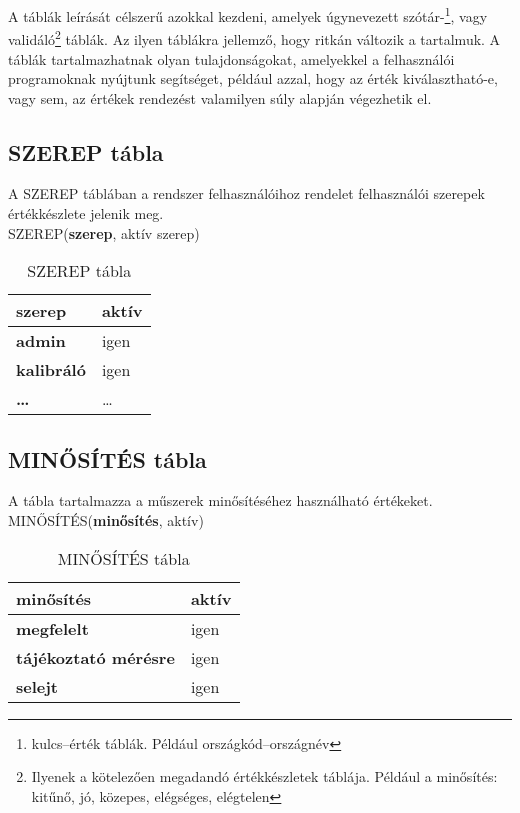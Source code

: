 \documentclass[a4paper,12pt]{report}
\newcommand{\pk}[1]{\textbf{#1}} %
\newcommand{\tabla}[1]{\noindent\MakeUppercase{#1}} %
\begin{document}
A táblák leírását célszerű azokkal kezdeni, amelyek úgynevezett 
szótár-\footnote{kulcs--érték táblák. Például országkód--országnév}, vagy
validáló\footnote{Ilyenek a kötelezően megadandó értékkészletek táblája. 
Például a minősítés: kitűnő, jó, közepes, elégséges, elégtelen} táblák.
Az ilyen táblákra jellemző, hogy ritkán változik a tartalmuk. A táblák 
tartalmazhatnak olyan tulajdonságokat, amelyekkel a felhasználói
programoknak nyújtunk segítséget, például azzal, hogy az érték
kiválasztható-e, vagy sem, az értékek rendezést valamilyen súly alapján 
végezhetik el.

\subsection{SZEREP tábla}
A \tabla{szerep} táblában a rendszer felhasználóihoz rendelet felhasználói 
szerepek értékkészlete jelenik meg.\\

\tabla{SZEREP}(\pk{szerep}, aktív szerep)

\begin{table}[ht!]
\centering
{\footnotesize \begin{tabular}[t]{|l|l|}
\hline
 \textbf{szerep}&aktív\\\hline
 \textbf{admin}&igen\\
 \textbf{kalibráló}&igen\\
 \textbf{\dots}&\dots\\
\end{tabular}}
\caption{SZEREP tábla} \label{tabSZEREP}
\end{table}


\subsection{MINŐSÍTÉS tábla}
A tábla tartalmazza a műszerek minősítéséhez használható értékeket.\\

\tabla{MINŐSÍTÉS}(\pk{minősítés}, aktív)
\begin{table}[ht!]
\centering
\begin{footnotesize}
\begin{tabular}[t]{|l|l|}
\hline
 \textbf{minősítés}&aktív\\\hline
 \textbf{megfelelt}&igen\\
 \textbf{tájékoztató mérésre}&igen\\
 \textbf{selejt}&igen\\
 \hline
\end{tabular}
\end{footnotesize}
\caption{MINŐSÍTÉS tábla} \label{tabMINOSITES}
\end{table}
\end{document}
